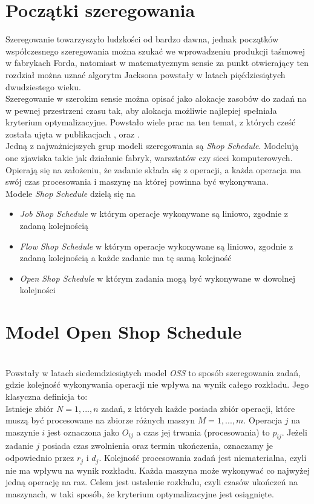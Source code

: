 \documentclass[brudnopis]{xmgr}
\begin{document}
\section{Początki szeregowania}
Szeregowanie towarzyszyło ludzkości od bardzo dawna, jednak początków współczesnego szeregowania można szukać we wprowadzeniu produkcji taśmowej w fabrykach Forda, natomiast w matematycznym sensie za punkt otwierający ten rozdział można uznać algorytm Jacksona powstały w latach pięćdziesiątych dwudziestego wieku.
\medskip\\
Szeregowanie w szerokim sensie można opisać jako alokacje zasobów do zadań na w pewnej przestrzeni czasu tak, aby alokacja możliwie najlepiej spełniała kryterium optymalizacyjne. Powstało wiele prac na ten temat, z których cześć została ujęta w publikacjach \cite{GRAVES:1970:X}, \cite{SEQSCHE:1973:X} oraz \cite{CURTRE:1997:X}.
\medskip\\
Jedną z najważniejszych grup modeli szeregowania są \emph{Shop Schedule}. Modelują one zjawiska takie jak działanie fabryk, warsztatów czy sieci komputerowych. Opierają się na założeniu, że zadanie składa się z operacji, a każda operacja ma swój czas procesowania i maszynę na której powinna być wykonywana.
\medskip\\
Modele \emph{Shop Schedule} dzielą się na
\begin{itemize}
    \item \emph{Job Shop Schedule} w którym operacje wykonywane są liniowo, zgodnie z zadaną kolejnością
    \item \emph{Flow Shop Schedule} w którym operacje wykonywane są liniowo, zgodnie z zadaną kolejnością a każde zadanie ma tę samą kolejność
    \item \emph{Open Shop Schedule} w którym zadania mogą być wykonywane w dowolnej kolejności
\end{itemize}

\section{Model Open Shop Schedule}
\medskip\\
Powstały w latach siedemdziesiątych model \emph{OSS} to sposób szeregowania zadań, gdzie kolejność wykonywania operacji nie wpływa na wynik całego rozkładu. Jego klasyczna definicja to:
\medskip\\
{Istnieje zbiór $N={1,...,n}$ zadań, z których każde posiada zbiór operacji, które muszą być procesowane na zbiorze różnych maszyn $M={1,...,m}$. Operacja $j$ na maszynie $i$ jest oznaczona jako $O_{ij}$ a czas jej trwania (procesowania) to $p_{ij}$. Jeżeli zadanie $j$ posiada czas zwolnienia oraz termin ukończenia, oznaczamy je odpowiednio przez $r_j$ i $d_j$. Kolejność procesowania zadań jest niematerialna, czyli nie ma wpływu na wynik rozkładu. Każda maszyna może wykonywać co najwyżej jedną operację na raz. Celem jest ustalenie rozkładu, czyli czasów ukończeń na maszynach, w taki sposób, że kryterium optymalizacyjne jest osiągnięte.}\cite{FourDecades:2020:X}
\medskip\\
\end{document}
